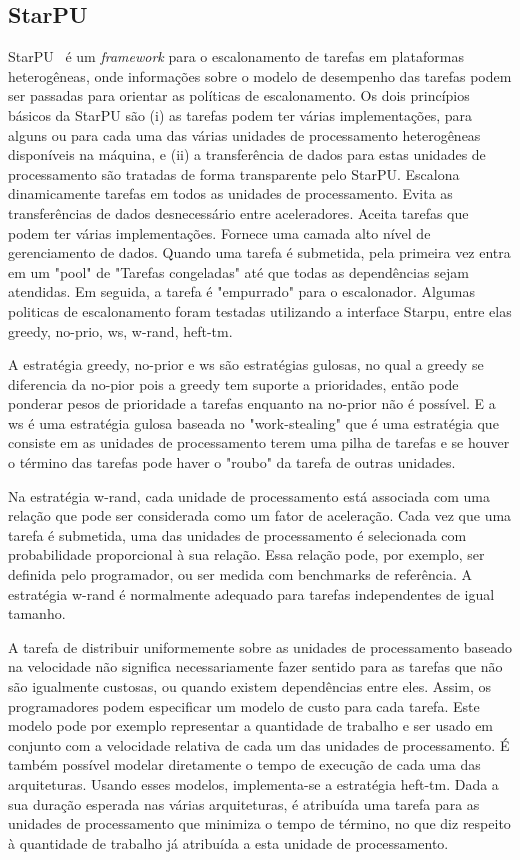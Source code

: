 \subsection{StarPU}

 StarPU~\citep{starpu} é um \textit{framework} para o escalonamento de tarefas em
plataformas heterogêneas, onde informações sobre o modelo de desempenho das
tarefas podem ser passadas para orientar as políticas de escalonamento. Os dois
princípios básicos da StarPU são (i) as tarefas podem ter várias implementações,
para alguns ou para cada uma das várias unidades de processamento heterogêneas
disponíveis na máquina, e (ii) a transferência de dados para estas unidades de
processamento são tratadas de forma transparente pelo StarPU. Escalona dinamicamente
tarefas em todos as unidades de processamento. Evita as transferências de dados  desnecessário entre aceleradores. Aceita tarefas que podem ter várias implementações. Fornece uma camada alto nível de gerenciamento de dados. Quando uma tarefa é submetida, pela primeira vez entra em um "pool" de "Tarefas congeladas" até que todas as dependências sejam atendidas. Em seguida, a tarefa é "empurrado" para o escalonador. Algumas politicas de escalonamento foram testadas utilizando a interface Starpu, entre elas greedy, no-prio, ws, w-rand, heft-tm. 

A estratégia greedy, no-prior e ws são estratégias gulosas, no qual  a greedy se diferencia da no-pior pois a greedy tem suporte a prioridades, então pode ponderar pesos de prioridade a tarefas enquanto na no-prior não é possível. E a ws é uma estratégia gulosa baseada no "work-stealing" que é uma estratégia que consiste em as unidades de processamento terem uma pilha de tarefas e se houver o término das tarefas pode haver o "roubo" da tarefa de outras unidades. 

Na estratégia w-rand, cada unidade de processamento está associada com uma relação que pode ser considerada como um fator de aceleração. Cada vez que uma tarefa é submetida, uma das unidades de processamento é selecionada com probabilidade proporcional à sua relação. Essa relação pode, por exemplo, ser definida pelo programador, ou ser medida com benchmarks de referência. A estratégia w-rand é normalmente adequado para tarefas independentes de igual tamanho.

A tarefa de distribuir uniformemente sobre as unidades de processamento baseado na velocidade não significa necessariamente fazer sentido para as tarefas que não são igualmente custosas, ou quando existem dependências entre eles. Assim, os programadores podem especificar um modelo de custo para cada tarefa. Este modelo pode por exemplo representar a quantidade de trabalho e ser usado em conjunto com a velocidade relativa de cada um das unidades de processamento. É também possível modelar diretamente o tempo de execução de cada uma das arquiteturas. Usando esses modelos, implementa-se a estratégia heft-tm. Dada a sua duração esperada nas várias arquiteturas, é atribuída uma tarefa para as unidades de processamento que minimiza o tempo de término, no que diz respeito à quantidade de trabalho já atribuída a esta unidade de processamento.

